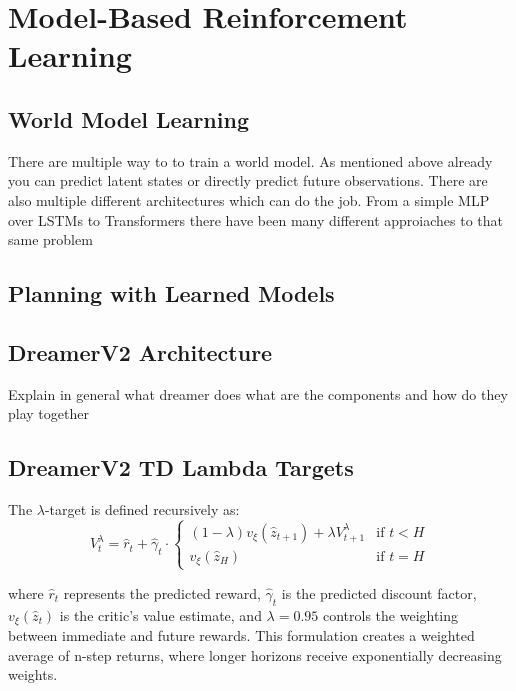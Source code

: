 \documentclass[
	english,
	ruledheaders=section,
	class=report,
	thesis={type=master},
	accentcolor=9c,
	custommargins=true,
	marginpar=false,
	parskip=half-,
	fontsize=11pt,
]{tudapub}
\begin{document}
\section{Model-Based Reinforcement Learning}
\label{sec:mbrl}

\subsection{World Model Learning}
\label{subsec:world_models}
There are multiple way to to train a world model. As mentioned above already you can predict latent states or directly predict future observations. There are also multiple different architectures which can do the job. From a simple MLP over LSTMs to Transformers there have been many different approiaches to that same problem

\subsection{Planning with Learned Models}
\label{subsec:planning}

\subsection{DreamerV2 Architecture}
\label{subsec:dreamerv2_arch}



Explain in general what dreamer does
what are the components and how do they play together

\subsection{DreamerV2 TD Lambda Targets}
\label{subsec:td_lambda}


The $\lambda$-target is defined recursively as:
\begin{equation}
V^{\lambda}_t = \hat{r}_t + \hat{\gamma}_t \cdot \begin{cases}
(1 - \lambda)v_\xi(\hat{z}_{t+1}) + \lambda V^{\lambda}_{t+1} & \text{if } t < H \\
v_\xi(\hat{z}_H) & \text{if } t = H
\end{cases}
\end{equation}

where $\hat{r}_t$ represents the predicted reward, $\hat{\gamma}_t$ is the predicted discount factor, $v_\xi(\hat{z}_t)$ is the critic's value estimate, and $\lambda = 0.95$ controls the weighting between immediate and future rewards. This formulation creates a weighted average of n-step returns, where longer horizons receive exponentially decreasing weights.
\end{document}
